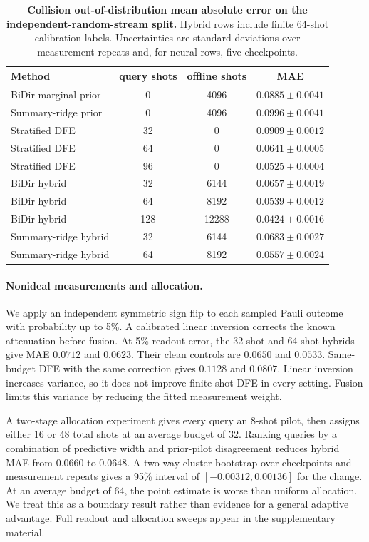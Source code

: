 \documentclass[12pt]{iopart}
\begin{document}
\begin{table}[h]
\centering
\caption{\textbf{Collision out-of-distribution mean absolute error on the independent-random-stream split.} Hybrid rows include finite 64-shot calibration labels. Uncertainties are standard deviations over measurement repeats and, for neural rows, five checkpoints.}
\label{tab:hybrid}
\small
\begin{tabular}{lccc}
\toprule
Method & query shots & offline shots & MAE \\
\midrule
BiDir marginal prior & 0 & 4096 & $0.0885\pm0.0041$ \\
Summary-ridge prior & 0 & 4096 & $0.0996\pm0.0041$ \\
\midrule
Stratified DFE & 32 & 0 & $0.0909\pm0.0012$ \\
Stratified DFE & 64 & 0 & $0.0641\pm0.0005$ \\
Stratified DFE & 96 & 0 & $0.0525\pm0.0004$ \\
\midrule
BiDir hybrid & 32 & 6144 & $0.0657\pm0.0019$ \\
BiDir hybrid & 64 & 8192 & $0.0539\pm0.0012$ \\
BiDir hybrid & 128 & 12288 & $0.0424\pm0.0016$ \\
Summary-ridge hybrid & 32 & 6144 & $0.0683\pm0.0027$ \\
Summary-ridge hybrid & 64 & 8192 & $0.0557\pm0.0024$ \\
\bottomrule
\end{tabular}
\end{table}

\paragraph*{Nonideal measurements and allocation.}
We apply an independent symmetric sign flip to each sampled Pauli outcome with probability up to 5\%. A calibrated linear inversion corrects the known attenuation before fusion. At 5\% readout error, the 32-shot and 64-shot hybrids give MAE $0.0712$ and $0.0623$. Their clean controls are $0.0650$ and $0.0533$. Same-budget DFE with the same correction gives $0.1128$ and $0.0807$. Linear inversion increases variance, so it does not improve finite-shot DFE in every setting. Fusion limits this variance by reducing the fitted measurement weight.

A two-stage allocation experiment gives every query an 8-shot pilot, then assigns either 16 or 48 total shots at an average budget of 32. Ranking queries by a combination of predictive width and prior-pilot disagreement reduces hybrid MAE from $0.0660$ to $0.0648$. A two-way cluster bootstrap over checkpoints and measurement repeats gives a 95\% interval of $[-0.00312,0.00136]$ for the change. At an average budget of 64, the point estimate is worse than uniform allocation. We treat this as a boundary result rather than evidence for a general adaptive advantage. Full readout and allocation sweeps appear in the supplementary material.
\end{document}
